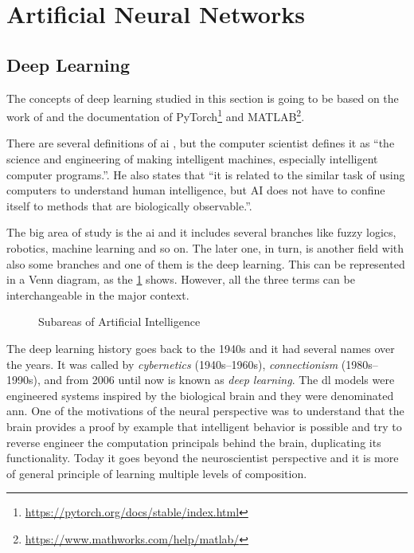 \section{Artificial Neural Networks}\label{sec:ann}

\subsection{Deep Learning}\label{sec:deep_learning}

The concepts of deep learning studied in this section is going to be based on the work of \citet{goodfellow2016} and the documentation of PyTorch\footnote{\url{https://pytorch.org/docs/stable/index.html}} and MATLAB\footnote{\url{https://www.mathworks.com/help/matlab/}}.

There are several definitions of \gls*{ai} \citep{winston1992}, but the  computer scientist \citet{mccarthy2007} defines it as ``the science and engineering of making intelligent machines, especially intelligent computer programs.''.
He also states that ``it is related to the similar task of using computers to understand human intelligence, but AI does not have to confine itself to methods that are biologically observable.''.

The big area of study is the \gls*{ai} and it includes several branches like fuzzy logics, robotics, machine learning and so on. 
The later one, in turn, is another field with also some branches and one of them is the deep learning.
This can be represented in a Venn diagram, as the \cref{fig:venn_dl} shows.
However, all the three terms can be interchangeable in the major context.
%
\begin{figure}[!htb]
    \centering
    
    \caption{Subareas of Artificial Intelligence}
    \label{fig:venn_dl}
\end{figure}

The deep learning history goes back to the 1940s and it had several names over the years. 
It was called by \emph{cybernetics} (1940s--1960s), \emph{connectionism} (1980s--1990s), and from 2006 until now is known as \emph{deep learning}.
The \gls*{dl} models were engineered systems inspired by the biological brain and they were denominated \gls*{ann}.
One of the motivations of the neural  perspective was to understand that the brain provides a proof by example that intelligent behavior is possible and try to reverse engineer the computation principals behind the brain, duplicating its functionality.
Today it goes beyond the neuroscientist perspective and it is more of general principle of learning multiple levels of composition.

